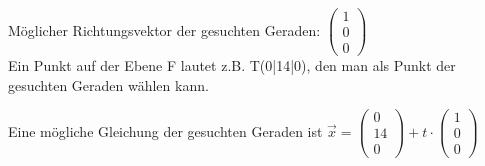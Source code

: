 \documentclass[10pt]{article}
\begin{document}
Möglicher Richtungsvektor der gesuchten Geraden: $\left(\begin{array}{l}1 \\ 0 \\ 0\end{array}\right)$\\
Ein Punkt auf der Ebene F lautet z.B. T(0|14|0), den man als Punkt der gesuchten Geraden wählen kann.

Eine mögliche Gleichung der gesuchten Geraden ist $\vec{x}=\left(\begin{array}{c}0 \\ 14 \\ 0\end{array}\right)+t \cdot\left(\begin{array}{l}1 \\ 0 \\ 0\end{array}\right)$
\end{document}
